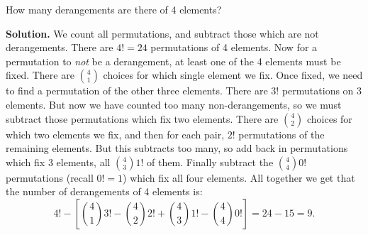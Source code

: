 \documentclass{book}
\begin{document}
\setcounter{project}{228}
\addtocounter{project}{-1}
\begin{activity}[]\label{activity-221}
\hypertarget{p-1262}{}%
How many derangements are there of 4 elements?%
\par\smallskip%
\noindent\textbf{Solution.}\hypertarget{solution-149}{}\quad%
\hypertarget{p-1263}{}%
We count all permutations, and subtract those which are not derangements. There are \(4! = 24\) permutations of 4 elements. Now for a permutation to \emph{not} be a derangement, at least one of the 4 elements must be fixed. There are \({4 \choose 1}\) choices for which single element we fix. Once fixed, we need to find a permutation of the other three elements. There are \(3!\) permutations on 3 elements. But now we have counted too many non-derangements, so we must subtract those permutations which fix two elements. There are \({4 \choose 2}\) choices for which two elements we fix, and then for each pair, \(2!\) permutations of the remaining elements. But this subtracts too many, so add back in permutations which fix 3 elements, all \({4 \choose 3}1!\) of them. Finally subtract the \({4 \choose 4}0!\) permutations (recall \(0! = 1\)) which fix all four elements. All together we get that the number of derangements of 4 elements is:%
\begin{equation*}
4! - \left[{4 \choose 1}3! - {4 \choose 2}2! + {4 \choose 3} 1! - {4 \choose 4}0!\right] = 24 - 15 = 9.
\end{equation*}
%
\end{activity}
\end{document}
